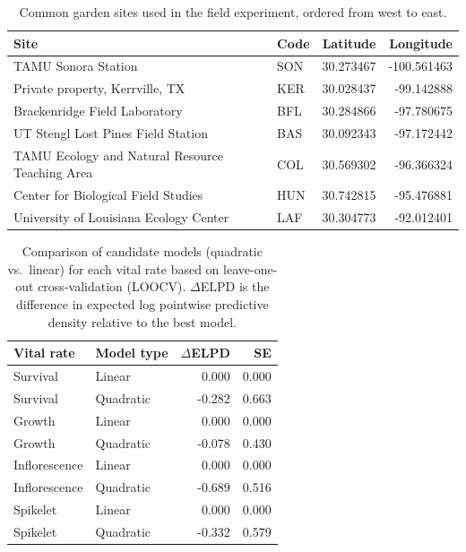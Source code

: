 \documentclass[12pt]{article}\usepackage[]{graphicx}\usepackage[dvipsnames]{xcolor}
\begin{document}
\begin{table}[ht]
\caption{Common garden sites used in the field experiment, ordered from west to east.}
\label{tab:exp_sites}
\begin{tabular}{llrr}
\hline
Site & Code & Latitude & Longitude \\
\hline
TAMU Sonora Station                              & SON & 30.273467 & -100.561463 \\
Private property, Kerrville, TX                  & KER & 30.028437 & -99.142888 \\
Brackenridge Field Laboratory                    & BFL & 30.284866 & -97.780675 \\
UT Stengl Lost Pines Field Station               & BAS & 30.092343 & -97.172442 \\
TAMU Ecology and Natural Resource Teaching Area  & COL & 30.569302 & -96.366324 \\
Center for Biological Field Studies              & HUN & 30.742815 & -95.476881 \\
University of Louisiana Ecology Center           & LAF & 30.304773 & -92.012401 \\
\hline
\end{tabular}
\end{table}
\clearpage

\begin{table}[ht]
\centering
\caption{Comparison of candidate models (quadratic vs.\ linear) for each vital rate based on leave-one-out cross-validation (LOOCV).
$\Delta$ELPD is the difference in expected log pointwise predictive density relative to the best model.}
\label{tab:model_comparison}
\begin{tabular}{llrr}
\hline
Vital rate & Model type & $\Delta$ELPD & SE \\
\hline
Survival      & Linear    & 0.000  & 0.000 \\
Survival      & Quadratic & -0.282 & 0.663 \\
Growth        & Linear    & 0.000  & 0.000 \\
Growth        & Quadratic & -0.078 & 0.430 \\
Inflorescence & Linear    & 0.000  & 0.000 \\
Inflorescence & Quadratic & -0.689 & 0.516 \\
Spikelet      & Linear    & 0.000  & 0.000 \\
Spikelet      & Quadratic & -0.332 & 0.579 \\
\hline
\end{tabular}
\end{table}
\clearpage
\end{document}
